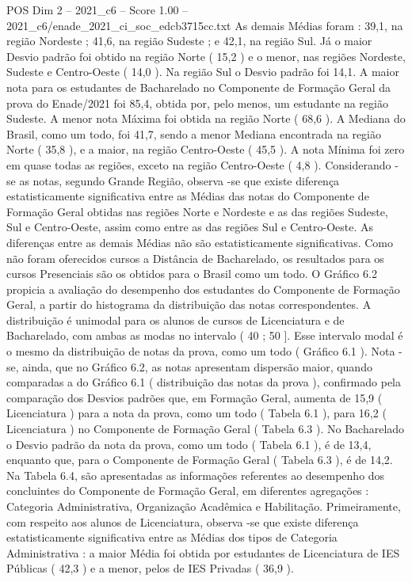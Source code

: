 \begin{textsample}{POS Dim 2 – 2021\_c6 – Score 1.00 – 2021\_c6/enade\_2021\_ci\_soc\_edcb3715cc.txt}
As demais Médias foram : 39,1, na região Nordeste ; 41,6, na região Sudeste ; e 42,1, na região Sul.
Já o maior Desvio padrão foi obtido na região Norte ( 15,2 ) e o menor, nas regiões Nordeste, Sudeste e Centro-Oeste ( 14,0 ).
Na região Sul o Desvio padrão foi 14,1.
A maior nota para os estudantes de Bacharelado no Componente de Formação Geral da prova do Enade/2021 foi 85,4, obtida por, pelo menos, um estudante na região Sudeste.
A menor nota Máxima foi obtida na região Norte ( 68,6 ).
A Mediana do Brasil, como um todo, foi 41,7, sendo a menor Mediana encontrada na região Norte ( 35,8 ), e a maior, na região Centro-Oeste ( 45,5 ).
A nota Mínima foi zero em quase todas as regiões, exceto na região Centro-Oeste ( 4,8 ).
Considerando -se as notas, segundo Grande Região, observa -se que existe diferença estatisticamente significativa entre as Médias das notas do Componente de Formação Geral obtidas nas regiões Norte e Nordeste e as das regiões Sudeste, Sul e Centro-Oeste, assim como entre as das regiões Sul e Centro-Oeste.
As diferenças entre as demais Médias não são estatisticamente significativas.
Como não foram oferecidos cursos a Distância de Bacharelado, os resultados para os cursos Presenciais são os obtidos para o Brasil como um todo.
O Gráfico 6.2 propicia a avaliação do desempenho dos estudantes do Componente de Formação Geral, a partir do histograma da distribuição das notas correspondentes.
A distribuição é unimodal para os alunos de cursos de Licenciatura e de Bacharelado, com ambas as modas no intervalo ( 40 ; 50 ].
Esse intervalo modal é o mesmo da distribuição de notas da prova, como um todo ( Gráfico 6.1 ).
Nota -se, ainda, que no Gráfico 6.2, as notas apresentam dispersão maior, quando comparadas a do Gráfico 6.1 ( distribuição das notas da prova ), confirmado pela comparação dos Desvios padrões que, em Formação Geral, aumenta de 15,9 ( Licenciatura ) para a nota da prova, como um todo ( Tabela 6.1 ), para 16,2 ( Licenciatura ) no Componente de Formação Geral ( Tabela 6.3 ).
No Bacharelado o Desvio padrão da nota da prova, como um todo ( Tabela 6.1 ), é de 13,4, enquanto que, para o Componente de Formação Geral ( Tabela 6.3 ), é de 14,2.
Na Tabela 6.4, são apresentadas as informações referentes ao desempenho dos concluintes do Componente de Formação Geral, em diferentes agregações : Categoria Administrativa, Organização Acadêmica e Habilitação.
Primeiramente, com respeito aos alunos de Licenciatura, observa -se que existe diferença estatisticamente significativa entre as Médias dos tipos de Categoria Administrativa : a maior Média foi obtida por estudantes de Licenciatura de IES Públicas ( 42,3 ) e a menor, pelos de IES Privadas ( 36,9 ).

\end{textsample}
